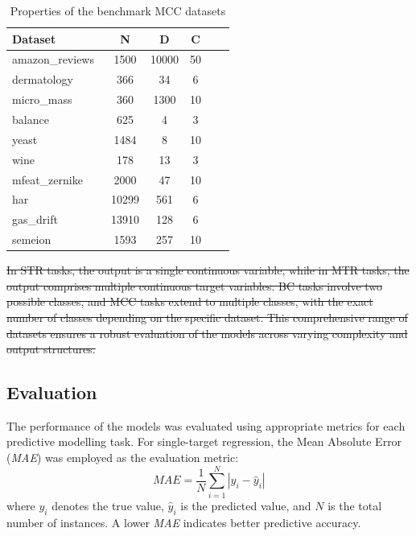 \documentclass[3p,review,authoryear]{elsarticle}
\newcommand{\mpop}[2]{{\color{orange}\sout{#1}\color{purple}{#2}}}
\begin{document}
\begin{table}[h!]
\centering
\caption{Properties of the benchmark MCC datasets}
\label{tab:mcc}
\begin{tabular}{@{}lccccc@{}}
\toprule
\textbf{Dataset}   & \textbf{N} & \textbf{D} & \textbf{C}     \\ \midrule
amazon\_reviews~\citep{openml}                  & 1500         & 10000   &  50     \\
dermatology~\citep{openml}                     & 366         & 34     &  6   \\
micro\_mass~\citep{openml}                   & 360         & 1300      &   10    \\
balance~\citep{openml}                   & 625         & 4       & 3  \\
yeast~\citep{mulan}                   & 1484         & 8    & 10  \\
wine~\citep{openml}             &  178        & 13     &  3   \\
mfeat\_zernike~\citep{openml}                & 2000         & 47   &  10   \\
har~\citep{openml}                  & 10299         & 561        &  6   \\
gas\_drift~\citep{openml}           & 13910         & 128      &   6   \\
semeion~\citep{openml}       & 1593         & 257    &   10  \\ \bottomrule
\end{tabular}
\end{table}

\mpop{In STR tasks, the output is a single continuous variable, while in MTR tasks, the output comprises multiple continuous target variables.
BC tasks involve two possible classes, and MCC tasks extend to multiple classes, with the exact number of classes depending on the specific dataset.
This comprehensive range of datasets ensures a robust evaluation of the models across varying complexity and output structures.}{}  


\subsection{Evaluation}

The performance of the models was evaluated using appropriate metrics for each predictive modelling task. For single-target regression, the Mean Absolute Error (\textit{MAE}) was employed as the evaluation metric:
\[
\textit{MAE} = \frac{1}{N} \sum_{i=1}^{N} \left| y_i - \hat{y}_i \right|
\]
where \( y_i \) denotes the true value, \(\hat{y}_i\) is the predicted value, and \(N\) is the total number of instances. A lower \textit{MAE} indicates better predictive accuracy.
\end{document}
